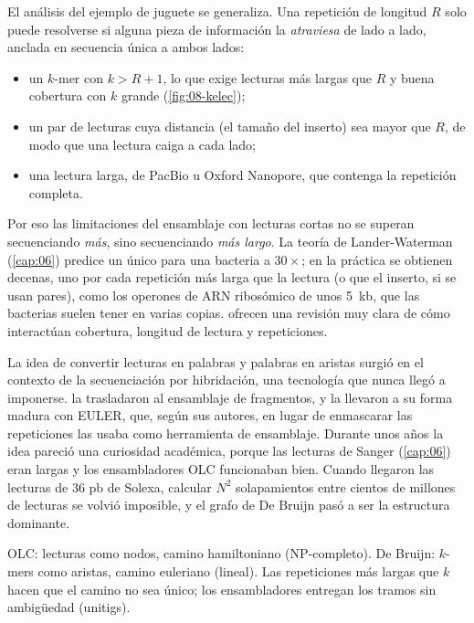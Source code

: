 El análisis del ejemplo de juguete se generaliza. Una repetición de longitud $R$ solo puede resolverse si alguna pieza de información la \emph{atraviesa} de lado a lado, anclada en secuencia única a ambos lados:
\begin{itemize}
  \item un $k$-mer con $k > R+1$, lo que exige lecturas más largas que $R$ y buena cobertura con $k$ grande (\cref{fig:08-kelec});
  \item un par de lecturas cuya distancia (el tamaño del inserto) sea mayor que $R$, de modo que una lectura caiga a cada lado;
  \item una lectura larga, de PacBio u Oxford Nanopore, que contenga la repetición completa.
\end{itemize}
Por eso las limitaciones del ensamblaje con lecturas cortas no se superan secuenciando \emph{más}, sino secuenciando \emph{más largo}. La teoría de Lander-Waterman (\cref{cap:06}) predice un único  para una bacteria a $30\times$; en la práctica se obtienen decenas, uno por cada repetición más larga que la lectura (o que el inserto, si se usan pares), como los operones de ARN ribosómico de unos \SI{5}{kb}, que las bacterias suelen tener en varias copias. \textcite{c08-nagarajan2013} ofrecen una revisión muy clara de cómo interactúan cobertura, longitud de lectura y repeticiones.

\begin{historia}
La idea de convertir lecturas en palabras y palabras en aristas surgió en el contexto de la secuenciación por hibridación, una tecnología que nunca llegó a imponerse. \textcite{c08-idury1995} la trasladaron al ensamblaje de fragmentos, y \textcite{c08-pevzner2001} la llevaron a su forma madura con EULER, que, según sus autores, en lugar de enmascarar las repeticiones las usaba como herramienta de ensamblaje. Durante unos años la idea pareció una curiosidad académica, porque las lecturas de Sanger (\cref{cap:06}) eran largas y los ensambladores OLC funcionaban bien. Cuando llegaron las lecturas de 36 pb de Solexa, calcular $N^2$ solapamientos entre cientos de millones de lecturas se volvió imposible, y el grafo de De Bruijn pasó a ser la estructura dominante.
\end{historia}

\begin{ideaclave}
OLC: lecturas como nodos, camino hamiltoniano (NP-completo). De Bruijn: $k$-mers como aristas, camino euleriano (lineal). Las repeticiones más largas que $k$ hacen que el camino no sea único; los ensambladores entregan los tramos sin ambigüedad (unitigs).
\end{ideaclave}

